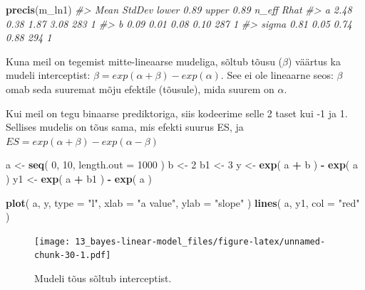 \documentclass[]{book}
\newenvironment{Shaded}{\begin{snugshade}}{\end{snugshade}}
\newcommand{\CommentTok}[1]{\textcolor[rgb]{0.56,0.35,0.01}{\textit{#1}}}
\newcommand{\DataTypeTok}[1]{\textcolor[rgb]{0.13,0.29,0.53}{#1}}
\newcommand{\DecValTok}[1]{\textcolor[rgb]{0.00,0.00,0.81}{#1}}
\newcommand{\KeywordTok}[1]{\textcolor[rgb]{0.13,0.29,0.53}{\textbf{#1}}}
\newcommand{\NormalTok}[1]{#1}
\newcommand{\OperatorTok}[1]{\textcolor[rgb]{0.81,0.36,0.00}{\textbf{#1}}}
\newcommand{\StringTok}[1]{\textcolor[rgb]{0.31,0.60,0.02}{#1}}
\begin{document}
\begin{Shaded}
\begin{Highlighting}[]
\KeywordTok{precis}\NormalTok{(m_ln1)}
\CommentTok{#>       Mean StdDev lower 0.89 upper 0.89 n_eff Rhat}
\CommentTok{#> a     2.48   0.38       1.87       3.08   283    1}
\CommentTok{#> b     0.09   0.01       0.08       0.10   287    1}
\CommentTok{#> sigma 0.81   0.05       0.74       0.88   294    1}
\end{Highlighting}
\end{Shaded}

Kuna meil on tegemist mitte-lineaarse mudeliga, sõltub tõusu (\(\beta\)) väärtus ka mudeli interceptist: \(\beta = exp(\alpha + \beta)-exp(\alpha)\). See ei ole lineaarne seos: \(\beta\) omab seda suuremat mõju efektile (tõusule), mida suurem on \(\alpha\).

Kui meil on tegu binaarse prediktoriga, siis kodeerime selle 2 taset kui -1 ja 1. Sellises mudelis on tõus sama, mis efekti suurus ES, ja \(ES = exp(\alpha + \beta)-exp(\alpha-\beta)\)

\begin{Shaded}
\begin{Highlighting}[]
\NormalTok{a <-}\StringTok{ }\KeywordTok{seq}\NormalTok{( }\DecValTok{0}\NormalTok{, }\DecValTok{10}\NormalTok{, }\DataTypeTok{length.out =} \DecValTok{1000}\NormalTok{ )}
\NormalTok{b <-}\StringTok{ }\DecValTok{2}
\NormalTok{b1 <-}\StringTok{ }\DecValTok{3}
\NormalTok{y <-}\StringTok{ }\KeywordTok{exp}\NormalTok{( a }\OperatorTok{+}\StringTok{ }\NormalTok{b ) }\OperatorTok{-}\StringTok{ }\KeywordTok{exp}\NormalTok{( a )}
\NormalTok{y1 <-}\StringTok{ }\KeywordTok{exp}\NormalTok{( a }\OperatorTok{+}\StringTok{ }\NormalTok{b1 ) }\OperatorTok{-}\StringTok{ }\KeywordTok{exp}\NormalTok{( a )}

\KeywordTok{plot}\NormalTok{( a, y, }\DataTypeTok{type =} \StringTok{"l"}\NormalTok{, }\DataTypeTok{xlab =} \StringTok{"a value"}\NormalTok{, }\DataTypeTok{ylab =} \StringTok{"slope"}\NormalTok{ )}
\KeywordTok{lines}\NormalTok{( a, y1, }\DataTypeTok{col =} \StringTok{"red"}\NormalTok{ )}
\end{Highlighting}
\end{Shaded}

\begin{figure}
\centering
\texttt{[image: 13\_bayes-linear-model\_files/figure-latex/unnamed-chunk-30-1.pdf]}
\caption{\label{fig:unnamed-chunk-30}Mudeli tõus sõltub interceptist.}
\end{figure}
\end{document}
